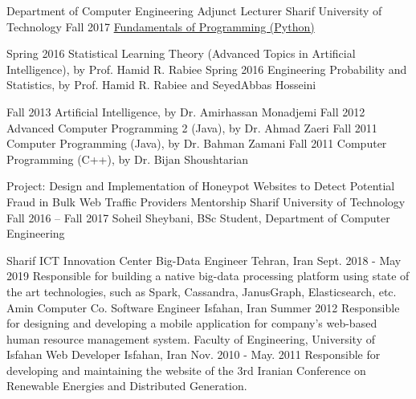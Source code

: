     
\begin{cventries}
\cventry
    {Department of Computer Engineering}
    {Adjunct Lecturer}
    {Sharif University of Technology}
    {Fall 2017}
    {\href{http://ce.sharif.edu/courses/96-97/1/ce153-12/}{Fundamentals of Programming (Python)}
    }
    
\cvexppos
    {Spring 2016}
    {
      Statistical Learning Theory (Advanced Topics in Artificial Intelligence), by Prof. Hamid R. Rabiee
    }
\cvexppos
    {Spring 2016}
    {
      Engineering Probability and Statistics, by Prof. Hamid R. Rabiee and SeyedAbbas Hosseini
    }
    
\cvexppos
    {Fall 2013}
    {
      Artificial Intelligence, by Dr. Amirhassan Monadjemi
    }
\cvexppos
    {Fall 2012}
    {
      Advanced Computer Programming 2 (Java), by Dr. Ahmad Zaeri
    }
\cvexppos
    {Fall 2011}
    {
      Computer Programming (Java), by Dr. Bahman Zamani
    }
\cvexppos
    {Fall 2011}
    {
      Computer Programming (C++), by Dr. Bijan Shoushtarian
    }
    
\cventry
    {Project: Design and Implementation of Honeypot Websites to Detect Potential Fraud in Bulk Web Traffic Providers}
    {Mentorship}
    {Sharif University of Technology}
    {Fall 2016 -- Fall 2017}
    {Soheil Sheybani, BSc Student, Department of Computer Engineering}
    
\end{cventries}

\begin{cventries}
\cventry
    {Sharif ICT Innovation Center}
    {Big-Data Engineer}
    {Tehran, Iran}
    {Sept. 2018 - May 2019}
    {
      Responsible for building a native big-data processing platform using state of the art technologies, such as Spark, Cassandra, JanusGraph, Elasticsearch, etc.
    }
\cventry
    {Amin Computer Co.}
    {Software Engineer}
    {Isfahan, Iran}
    {Summer 2012}
    {
      Responsible for designing and developing a mobile application for company's web-based human resource management system.
    }
  \cventry
    {Faculty of Engineering, University of Isfahan}
    {Web Developer}
    {Isfahan, Iran}
    {Nov. 2010 - May. 2011}
    {
      Responsible for developing and maintaining the website of the 3rd Iranian Conference on Renewable Energies and Distributed Generation.
    }
\end{cventries}

